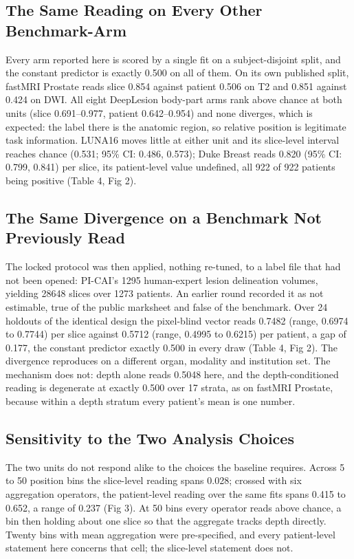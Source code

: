 \documentclass[11pt,letterpaper]{article}
\begin{document}
\subsection*{The Same Reading on Every Other Benchmark-Arm}

Every arm reported here is scored by a single fit on a subject-disjoint split,
and the constant predictor is exactly 0.500 on all of them. On its own published
split, fastMRI Prostate reads slice 0.854 against patient 0.506 on T2 and 0.851
against 0.424 on DWI. All eight DeepLesion body-part arms rank above chance at
both units (slice 0.691--0.977, patient 0.642--0.954) and none diverges, which is
expected: the label there is the anatomic region, so relative position is
legitimate task information. LUNA16 moves little at either unit and its
slice-level interval reaches chance (0.531; 95\% CI: 0.486, 0.573); Duke Breast
reads 0.820 (95\% CI: 0.799, 0.841) per slice, its patient-level value undefined,
all 922 of 922 patients being positive (Table 4, Fig 2).

\subsection*{The Same Divergence on a Benchmark Not Previously Read}

The locked protocol was then applied, nothing re-tuned, to a label file that had
not been opened: PI-CAI's \num{1295} human-expert lesion delineation volumes,
yielding \num{28648} slices over \num{1273} patients. An earlier round recorded it as not
estimable, true of the public marksheet and false of the benchmark. Over 24 holdouts of the identical design the pixel-blind vector reads
0.7482 (range, 0.6974 to 0.7744) per slice against 0.5712 (range, 0.4995 to
0.6215) per patient, a gap of 0.177, the constant predictor exactly 0.500 in every
draw (Table 4, Fig 2). The divergence reproduces on a different organ, modality
and institution set. The mechanism does not: depth alone reads 0.5048 here, and
the depth-conditioned reading is degenerate at exactly 0.500 over 17 strata, as on
fastMRI Prostate, because within a depth stratum every patient's mean is one
number.

\subsection*{Sensitivity to the Two Analysis Choices}

The two units do not respond alike to the choices the baseline requires. Across 5
to 50 position bins the slice-level reading spans 0.028; crossed with six
aggregation operators, the patient-level reading over the same fits spans 0.415
to 0.652, a range of 0.237 (Fig 3). At 50 bins every operator reads above chance,
a bin then holding about one slice so that the aggregate tracks depth directly.
Twenty bins with mean aggregation were pre-specified, and every patient-level
statement here concerns that cell; the slice-level statement does not.
\end{document}
